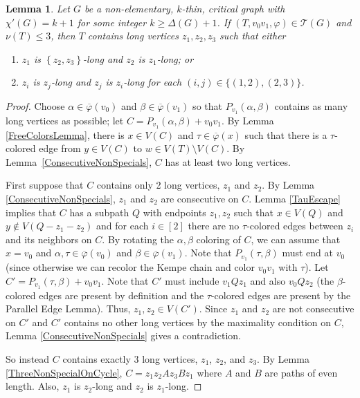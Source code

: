 \documentclass[12pt]{amsart}
\theoremstyle{plain}
\newtheorem{lem}[thm]{Lemma}
\theoremstyle{definition}
\theoremstyle{remark}
\newcommand{\fancy}[1]{\mathcal{#1}}
\newcommand{\T}{\fancy{T}}
\newcommand{\set}[1]{\left\{ #1 \right\}}
\newcommand{\irange}[1]{\left[#1\right]}
\newcommand{\vph}{\varphi}
\newcommand{\vphn}{\overline{\varphi}}
\begin{document}
\begin{lem}\label{MasterHelper}
Let $G$ be a non-elementary, $k$-thin, critical graph with $\chi'(G) = k+1$ for
some integer $k \ge \Delta(G) + 1$.  If $(T, v_0v_1, \vph) \in \T(G)$ and
$\nu(T) \le 3$, then $T$ contains long vertices $z_1,z_2,z_3$ such that either 
\begin{enumerate}
\item $z_1$ is $\set{z_2,z_3}$-long and $z_2$ is $z_1$-long; or
\item $z_i$ is $z_j$-long and $z_j$ is $z_i$-long for each %
$(i,j)\in\{(1,2),(2,3)\}$.
\end{enumerate}
\end{lem}
\begin{proof}
Choose $\alpha \in \vphn(v_0)$ and $\beta \in \vphn(v_1)$ so that
$P_{v_1}(\alpha, \beta)$ contains as many long vertices as possible;
let $C=P_{v_1}(\alpha,\beta)+v_0v_1$.
By Lemma \ref{FreeColorsLemma}, there is $x \in V(C)$ and $\tau \in \vphn(x)$
such that there is a $\tau$-colored edge from $y \in V(C)$ to $w \in V(T)
\setminus V(C)$.  By Lemma~\ref{ConsecutiveNonSpecials}, $C$ has at least two
long vertices.

First suppose that $C$ contains only 2 long vertices, $z_1$ and $z_2$.  By
Lemma \ref{ConsecutiveNonSpecials}, $z_1$ and $z_2$ are consecutive on $C$.
Lemma \ref{TauEscape} implies that $C$ has a subpath $Q$ 
with endpoints $z_1,z_2$ such that $x \in V(Q)$ and $y \not \in V(Q-z_1-z_2)$ 
and for each $i \in \irange{2}$ 
there are no $\tau$-colored edges between $z_i$ and its neighbors on $C$.
%
By rotating the $\alpha,\beta$ coloring of $C$, we can assume that $x = v_0$ and
$\alpha,\tau\in \vphn(v_0)$ and $\beta\in\vphn(v_1)$. 
Note that $P_{v_1}(\tau,\beta)$ must end at $v_0$ (since otherwise we can
recolor the Kempe chain and color $v_0v_1$ with $\tau$).  
Let $C' = P_{v_1}(\tau, \beta) + v_0v_1$.  Note that $C'$ must include $v_1Qz_1$
and also $v_0Qz_2$ (the $\beta$-colored edges are present by definition and the
$\tau$-colored edges are present by the Parallel Edge Lemma).  Thus, $z_1,z_2\in
V(C')$.  Since $z_1$ and $z_2$ are not consecutive on $C'$
and $C'$ contains no other long vertices by the maximality condition on $C$,
Lemma \ref{ConsecutiveNonSpecials} gives a contradiction.

So instead $C$ contains exactly 3 long vertices, $z_1$, $z_2$, and $z_3$.  By Lemma
\ref{ThreeNonSpecialOnCycle}, $C = z_1z_2Az_3Bz_1$ where $A$ and $B$ are paths
of even length.  Also, $z_1$ is $z_2$-long and $z_2$ is $z_1$-long.  


\end{proof}
\end{document}
